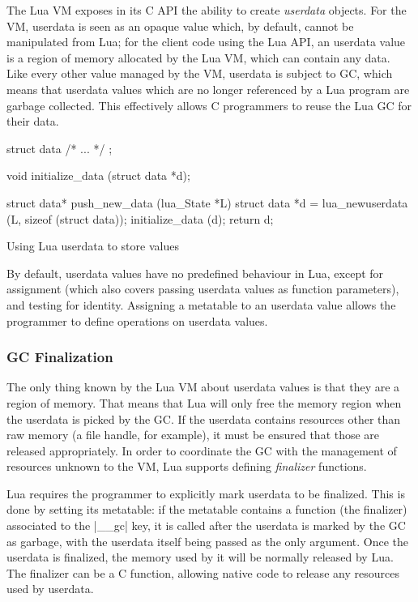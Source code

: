 The Lua VM exposes in its C API the ability to create \emph{userdata} objects.
For the VM, userdata is seen as an opaque value which, by default, cannot be
manipulated from Lua; for the client code using the Lua API, an userdata value
is a region of memory allocated by the Lua VM, which can contain any data.
Like every other value managed by the VM, userdata is subject to \gls{GC},
which means that userdata values which are no longer referenced by a Lua
program are garbage collected. This effectively allows C programmers to reuse
the Lua GC for their data.

\begin{listing}[tH]
  \centering
  \begin{ccode}
  struct data { /* ... */ };

  void initialize_data (struct data *d);

  struct data* push_new_data (lua_State *L) {
    struct data *d = lua_newuserdata (L, sizeof (struct data));
    initialize_data (d);
    return d;
  }
  \end{ccode}
  \caption{Using Lua userdata to store values}
  \label{lst:values-in-userdata}
\end{listing}

By default, userdata values have no predefined behaviour in Lua, except for
assignment (which also covers passing userdata values as function parameters),
and testing for identity. Assigning a metatable to an userdata value allows
the programmer to define operations on userdata values.


\subsubsection{GC Finalization}

The only thing known by the Lua VM about userdata values is that they are
a region of memory. That means that Lua will only free the memory region when
the userdata is picked by the \gls{GC}. If the userdata contains resources
other than raw memory (a file handle, for example), it must be ensured that
those are released appropriately. In order to coordinate the GC with the
management of resources unknown to the VM, Lua supports defining
\emph{finalizer} functions.

Lua requires the programmer to explicitly mark userdata to be finalized. This
is done by setting its metatable: if the metatable contains a function (the
finalizer) associated to the \Mlua|__gc| key, it is called after the userdata
is marked by the GC as garbage, with the userdata itself being passed as the
only argument. Once the userdata is finalized, the memory used by it will be
normally released by Lua. The finalizer can be a C function, allowing native
code to release any resources used by userdata.

